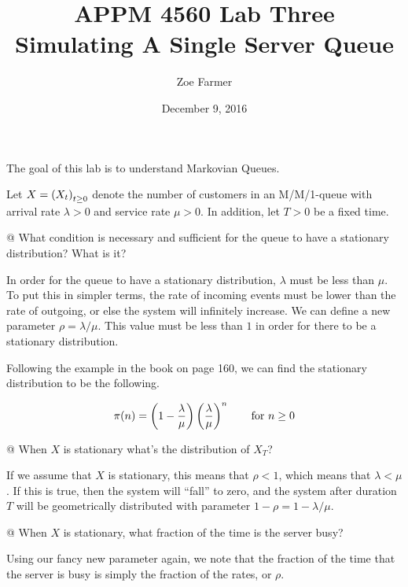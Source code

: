 \documentclass[10pt]{article}
\title{APPM 4560 Lab Three\\Simulating A Single Server Queue}
\author{Zoe Farmer}
\date{December 9, 2016}
\begin{document}
\maketitle

The goal of this lab is to understand Markovian Queues.

Let $X = \left( X_t \right)_{t \ge 0}$ denote the number of customers in an M/M/1-queue
with arrival rate $\lambda > 0$ and service rate $\mu > 0$. In addition, let $T
> 0$ be a fixed time.

\vspace{0.5cm}
\begin{easylist}[enumerate]
    @ What condition is necessary and sufficient for the queue to have a
    stationary distribution? What is it?
    \vspace{0.5cm}

    In  order for the queue to have a stationary distribution, $\lambda$ must be
    less than $\mu$. To put this in simpler terms, the rate of incoming events
    must be lower than the rate of outgoing, or else the system will infinitely
    increase. We can define a new parameter $\rho = \lambda / \mu$. This value
    must be less than $1$ in order for there to be a stationary distribution.

    Following the example in the book on page 160, we can find the stationary
    distribution to be the following.

    \begin{align*}
        \pi(n) =
        \left( 1 - \frac{\lambda}{\mu} \right)
        \left( \frac{\lambda}{\mu} \right)^n
        \qquad \text{for } n \ge 0
    \end{align*}

    \vspace{0.5cm}
    @ When $X$ is stationary what's the distribution of $X_T$?
    \vspace{0.5cm}

    If we assume that $X$ is stationary, this means that $\rho < 1$, which means
    that $\lambda < \mu$. If this is true, then the system will ``fall'' to
    zero, and the system after duration $T$ will be geometrically distributed
    with parameter $1 - \rho = 1 - \lambda / \mu$.

    \vspace{0.5cm}
    @ When $X$ is stationary, what fraction of the time is the server busy?
    \vspace{0.5cm}

    Using our fancy new parameter again, we note that the fraction of the time
    that the server is busy is simply the fraction of the rates, or $\rho$.


\end{easylist}
\end{document}
